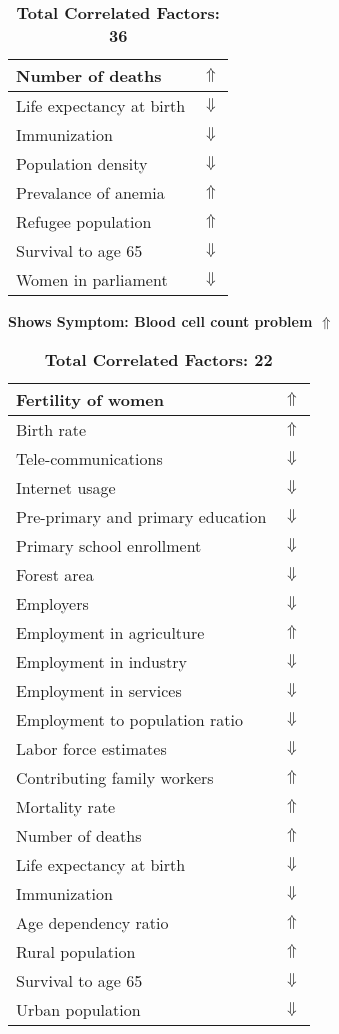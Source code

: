 \documentclass[12pt,notitlepage,oneside]{report}
\begin{document}
\begin{table}[!htb]
\begin{tabular}{|l|l|}
Number of deaths & $\Uparrow$\\ \hline
Life expectancy at birth & $\Downarrow$\\ \hline
Immunization & $\Downarrow$\\ \hline
Population density & $\Downarrow$\\ \hline
Prevalance of anemia & $\Uparrow$\\ \hline
Refugee population & $\Uparrow$\\ \hline
Survival to age 65 & $\Downarrow$\\ \hline
Women in parliament & $\Downarrow$\\ \hline
\end{tabular}
\caption*{\textbf{Total Correlated Factors: 36}}
\end{table}
\clearpage
\begin{table}[!htb]
\caption{\textbf{Shows Symptom: Blood cell count problem $\Uparrow$}}
\centering
\label{Correlated Socio-economic Factors0}
\begin{tabular}{|l|l|}
\hline
Fertility of women & $\Uparrow$\\ \hline
Birth rate & $\Uparrow$\\ \hline
Tele-communications & $\Downarrow$\\ \hline
Internet usage & $\Downarrow$\\ \hline
Pre-primary and primary education & $\Downarrow$\\ \hline
Primary school enrollment & $\Downarrow$\\ \hline
Forest area & $\Downarrow$\\ \hline
Employers & $\Downarrow$\\ \hline
Employment in agriculture & $\Uparrow$\\ \hline
Employment in industry & $\Downarrow$\\ \hline
Employment in services & $\Downarrow$\\ \hline
Employment to population ratio & $\Downarrow$\\ \hline
Labor force estimates & $\Downarrow$\\ \hline
Contributing family workers & $\Uparrow$\\ \hline
Mortality rate & $\Uparrow$\\ \hline
Number of deaths & $\Uparrow$\\ \hline
Life expectancy at birth & $\Downarrow$\\ \hline
Immunization & $\Downarrow$\\ \hline
Age dependency ratio & $\Uparrow$\\ \hline
Rural population & $\Uparrow$\\ \hline
Survival to age 65 & $\Downarrow$\\ \hline
Urban population & $\Downarrow$\\ \hline
\end{tabular}
\caption*{\textbf{Total Correlated Factors: 22}}
\end{table}
\end{document}
